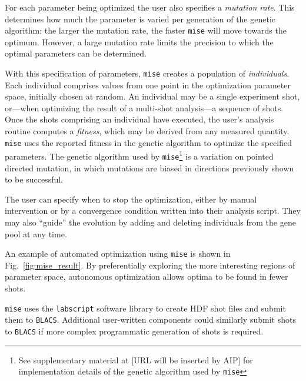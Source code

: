 For each parameter being optimized the user also specifies a \textit{mutation rate}.
This determines how much the parameter is varied per generation of the genetic algorithm: the larger the mutation rate, the faster \texttt{mise} will move towards the optimum.
However, a large mutation rate limits the precision to which the optimal parameters can be determined.

With this specification of parameters, \texttt{mise} creates a population of \textit{individuals}.
Each individual comprises values from one point in the optimization parameter space, initially chosen at random.
An individual may be a single experiment shot, or---when optimizing the result of a multi-shot analysis---a sequence of shots.
Once the shots comprising an individual have executed, the user's analysis routine computes a \textit{fitness}, which may be derived from any measured quantity.
\texttt{mise} uses the reported fitness in the genetic algorithm to optimize the specified parameters.
The genetic algorithm used by \texttt{mise}\footnote{See supplementary material at [URL will be inserted by AIP] for implementation details of the genetic algorithm used by \texttt{mise}} is a variation on pointed directed mutation\cite{berry_pod_2004}, in which mutations are biased in directions previously shown to be successful.

The user can specify when to stop the optimization, either by manual intervention or by a convergence condition written into their analysis script.
They may also ``guide'' the evolution by adding and deleting individuals from the gene pool at any time.

An example of automated optimization using \texttt{mise} is shown in Fig.~\ref{fig:mise_result}.
By preferentially exploring the more interesting regions of parameter space, autonomous optimization allows optima to be found in fewer shots.

\texttt{mise} uses the \texttt{labscript} software library to create HDF shot files and submit them to \texttt{BLACS}.
Additional user-written components could similarly submit shots to \texttt{BLACS} if more complex programmatic generation of shots is required.

